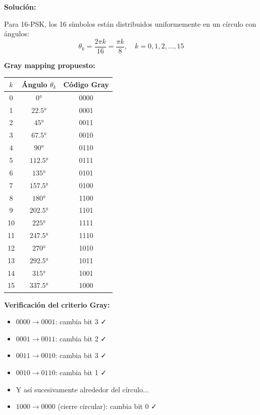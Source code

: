 \documentclass[11pt,a4paper]{article}
\begin{document}
\vspace{0.3cm}
\textbf{Soluci\'on:}

Para 16-PSK, los 16 s\'imbolos est\'an distribuidos uniformemente en un c\'irculo con \'angulos:
\[
\theta_k = \frac{2\pi k}{16} = \frac{\pi k}{8}, \quad k = 0, 1, 2, \ldots, 15
\]

\textbf{Gray mapping propuesto:}

\begin{center}
\begin{tabular}{|c|c|c|}
\hline
\textbf{$k$} & \textbf{\'Angulo $\theta_k$} & \textbf{C\'odigo Gray} \\
\hline
0 & $0°$ & 0000 \\
1 & $22.5°$ & 0001 \\
2 & $45°$ & 0011 \\
3 & $67.5°$ & 0010 \\
4 & $90°$ & 0110 \\
5 & $112.5°$ & 0111 \\
6 & $135°$ & 0101 \\
7 & $157.5°$ & 0100 \\
8 & $180°$ & 1100 \\
9 & $202.5°$ & 1101 \\
10 & $225°$ & 1111 \\
11 & $247.5°$ & 1110 \\
12 & $270°$ & 1010 \\
13 & $292.5°$ & 1011 \\
14 & $315°$ & 1001 \\
15 & $337.5°$ & 1000 \\
\hline
\end{tabular}
\end{center}

\textbf{Verificaci\'on del criterio Gray:}

\begin{itemize}
    \item $0000 \rightarrow 0001$: cambia bit 3 ✓
    \item $0001 \rightarrow 0011$: cambia bit 2 ✓
    \item $0011 \rightarrow 0010$: cambia bit 3 ✓
    \item $0010 \rightarrow 0110$: cambia bit 1 ✓
    \item Y as\'i sucesivamente alrededor del c\'irculo...
    \item $1000 \rightarrow 0000$ (cierre circular): cambia bit 0 ✓
\end{itemize}
\end{document}
